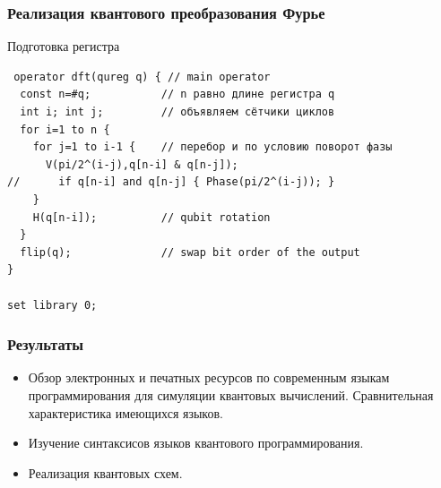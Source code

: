 \documentclass{beamer}
\begin{document}
\begin{frame}[fragile]
 \frametitle{Реализация квантового преобразования Фурье}
 \begin{block}{Подготовка регистра}
 \begin{verbatim}
 operator dft(qureg q) { // main operator
  const n=#q;           // n равно длине регистра q
  int i; int j;         // объявляем сётчики циклов
  for i=1 to n {
    for j=1 to i-1 {    // перебор и по условию поворот фазы
      V(pi/2^(i-j),q[n-i] & q[n-j]);
//      if q[n-i] and q[n-j] { Phase(pi/2^(i-j)); }
    }
    H(q[n-i]);          // qubit rotation
  }    
  flip(q);              // swap bit order of the output
}

set library 0;
\end{verbatim}  
 \end{block}
\end{frame}

\begin{frame}
 \frametitle{Результаты}

\begin{itemize}
  \item Обзор электронных и печатных ресурсов по современным языкам программирования для симуляции квантовых вычислений. Сравнительная характеристика имеющихся языков.
  \item Изучение синтаксисов языков квантового программирования.
  \item Реализация квантовых схем.
\end{itemize}
\end{frame}
\end{document}
